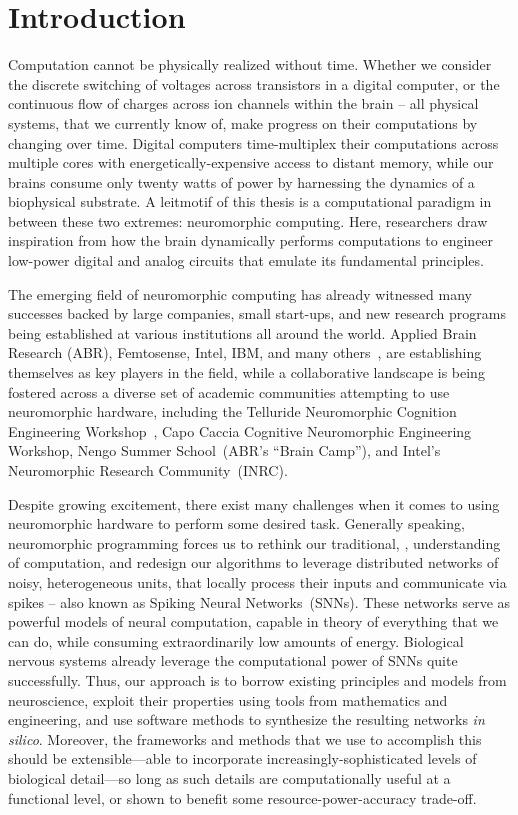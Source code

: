 
\chapter{Introduction}

Computation cannot be physically realized without time.
Whether we consider the discrete switching of voltages across transistors in a
digital computer,
or the continuous flow of charges across ion channels within the brain -- 
all physical systems, that we currently know of, make progress on their computations
by changing over time.
Digital computers time-multiplex their computations across multiple cores with energetically-expensive access to distant memory, while our brains consume only twenty watts of power by harnessing the dynamics of a biophysical substrate.
A leitmotif of this thesis is a computational paradigm
in between these two extremes: neuromorphic computing.
Here, researchers draw inspiration from how the
brain dynamically performs computations
to engineer low-power digital and analog circuits that emulate its fundamental principles.

The emerging field of neuromorphic computing has already
witnessed many successes backed by large companies, small start-ups, and new research
programs being established at various institutions all around the world.
Applied Brain Research (ABR), Femtosense, Intel, IBM, and many others~\citep{marketreport2018}, are establishing themselves as key players in the field, while a collaborative landscape is being fostered across a diverse set of academic communities attempting to use neuromorphic hardware, including the Telluride Neuromorphic Cognition Engineering Workshop~\citep{cohen2001report}, Capo Caccia Cognitive Neuromorphic Engineering Workshop, Nengo Summer School~(ABR's ``Brain Camp''), and Intel's Neuromorphic Research Community~(INRC).

Despite growing excitement, there exist many challenges when it comes to using
neuromorphic hardware to perform some desired task.
Generally speaking, neuromorphic programming forces us to rethink our traditional,
\citet{von1958}, understanding of computation, and redesign our algorithms to leverage distributed networks of noisy, heterogeneous units, that locally process their inputs and communicate via spikes -- also known as Spiking Neural Networks~(SNNs).
These networks serve as powerful models of neural computation, capable in theory of everything that we can do, while consuming extraordinarily low amounts of energy.
Biological nervous systems already leverage the computational power of SNNs quite successfully.
Thus, our approach is to borrow existing
principles and models from neuroscience, exploit their properties using tools from mathematics and engineering,
and use software methods to synthesize the resulting networks \emph{in silico}.
Moreover, the frameworks and methods that we use to accomplish this should be extensible---able to incorporate increasingly-sophisticated levels of biological detail---so long as such details are computationally useful at a functional level, or shown to benefit some resource-power-accuracy trade-off.

